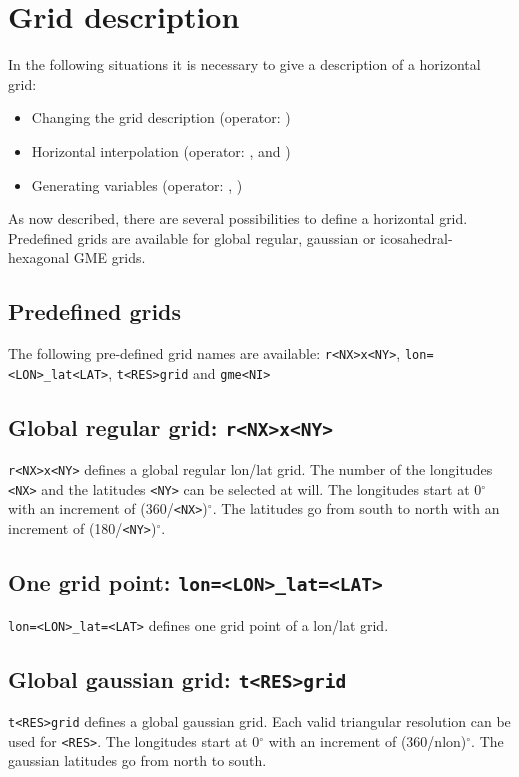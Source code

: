 \section{Grid description}
\label{GRID_DESCRIPTION}

In the following situations it is necessary to give a description of a horizontal grid:

\begin{itemize}
\item Changing the grid description (operator: )
\item Horizontal interpolation (operator: ,  and )
\item Generating variables (operator: , )
\end{itemize}

As now described, there are several possibilities to define a horizontal grid.
Predefined grids are available for global regular, gaussian or icosahedral-hexagonal GME grids.


\subsection{Predefined grids}

The following pre-defined grid names are available: 
{\tt r<NX>x<NY>}, {\tt lon=<LON>\_lat<LAT>}, {\tt t<RES>grid} and {\tt gme<NI>}

\subsection*{Global regular grid: {\tt r<NX>x<NY>}}
    {\tt r<NX>x<NY>} defines a global regular lon/lat grid.
    The number of the longitudes {\tt <NX>} and the latitudes {\tt <NY>}
    can be selected at will.
    The longitudes start at 0$^\circ$ with an increment of (360/{\tt <NX>})$^\circ$.
    The latitudes go from south to north with an increment of (180/{\tt <NY>})$^\circ$.

\subsection*{One grid point: {\tt lon=<LON>\_lat=<LAT>}}
    {\tt lon=<LON>\_lat=<LAT>} defines one grid point of a lon/lat grid.

\subsection*{Global gaussian grid: {\tt t<RES>grid}}
    {\tt t<RES>grid} defines a global gaussian grid.
    Each valid triangular resolution can be used for {\tt <RES>}.
    The longitudes start at 0$^\circ$ with an increment of (360/nlon)$^\circ$.
    The gaussian latitudes go from north to south.

